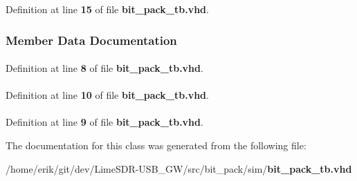 Definition at line {\bf 15} of file {\bf bit\+\_\+pack\+\_\+tb.\+vhd}.



\subsubsection{Member Data Documentation}
\paragraph[{ieee}]{\hspace{0.3cm}{\ttfamily [Library]}}\label{classbit__pack__tb_a0a6af6eef40212dbaf130d57ce711256}


Definition at line {\bf 8} of file {\bf bit\+\_\+pack\+\_\+tb.\+vhd}.

\paragraph[{numeric\+\_\+std}]{\hspace{0.3cm}{\ttfamily [Package]}}\label{classbit__pack__tb_a2edc34402b573437d5f25fa90ba4013e}


Definition at line {\bf 10} of file {\bf bit\+\_\+pack\+\_\+tb.\+vhd}.

\paragraph[{std\+\_\+logic\+\_\+1164}]{\hspace{0.3cm}{\ttfamily [Package]}}\label{classbit__pack__tb_acd03516902501cd1c7296a98e22c6fcb}


Definition at line {\bf 9} of file {\bf bit\+\_\+pack\+\_\+tb.\+vhd}.



The documentation for this class was generated from the following file\+:\begin{DoxyCompactItemize}
\item 
/home/erik/git/dev/\+Lime\+S\+D\+R-\/\+U\+S\+B\+\_\+\+G\+W/src/bit\+\_\+pack/sim/{\bf bit\+\_\+pack\+\_\+tb.\+vhd}\end{DoxyCompactItemize}
